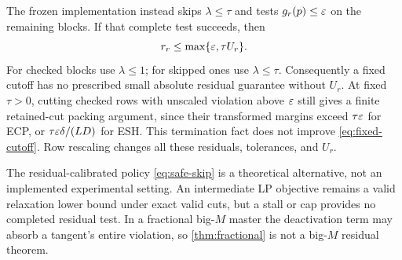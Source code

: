 The frozen implementation instead skips $\lambda\le\tau$ and tests $g_r(p)\le\varepsilon$ on the remaining blocks. If that complete test succeeds, then
\begin{equation}\label{eq:fixed-cutoff}
 r_r\le\max\{\varepsilon,\tau U_r\}.
\end{equation}
For checked blocks use $\lambda\le1$; for skipped ones use $\lambda\le\tau$. Consequently a fixed cutoff has no prescribed small absolute residual guarantee without $U_r$. At fixed $\tau>0$, cutting checked rows with unscaled violation above $\varepsilon$ still gives a finite retained-cut packing argument, since their transformed margins exceed $\tau\varepsilon$ for ECP, or $\tau\varepsilon\delta/(LD)$ for ESH. This termination fact does not improve \eqref{eq:fixed-cutoff}. Row rescaling changes all these residuals, tolerances, and $U_r$.

The residual-calibrated policy \eqref{eq:safe-skip} is a theoretical alternative, not an implemented experimental setting. An intermediate LP objective remains a valid relaxation lower bound under exact valid cuts, but a stall or cap provides no completed residual test. In a fractional big-$M$ master the deactivation term may absorb a tangent's entire violation, so \cref{thm:fractional} is not a big-$M$ residual theorem.

